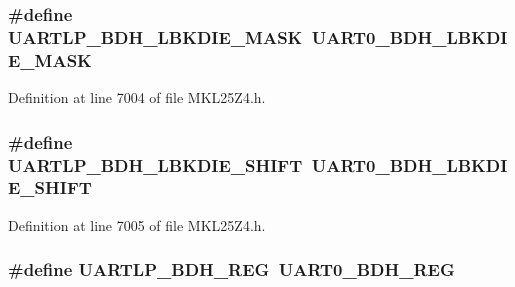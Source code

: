 \subsubsection[{\texorpdfstring{U\+A\+R\+T\+L\+P\+\_\+\+B\+D\+H\+\_\+\+L\+B\+K\+D\+I\+E\+\_\+\+M\+A\+SK}{UARTLP_BDH_LBKDIE_MASK}}]{\setlength{\rightskip}{0pt plus 5cm}\#define U\+A\+R\+T\+L\+P\+\_\+\+B\+D\+H\+\_\+\+L\+B\+K\+D\+I\+E\+\_\+\+M\+A\+SK~{\bf U\+A\+R\+T0\+\_\+\+B\+D\+H\+\_\+\+L\+B\+K\+D\+I\+E\+\_\+\+M\+A\+SK}}\hypertarget{group___backward___compatibility___symbols_ga8e7625a181ceadbf341a36dfcb59db33}{}\label{group___backward___compatibility___symbols_ga8e7625a181ceadbf341a36dfcb59db33}


Definition at line 7004 of file M\+K\+L25\+Z4.\+h.

\subsubsection[{\texorpdfstring{U\+A\+R\+T\+L\+P\+\_\+\+B\+D\+H\+\_\+\+L\+B\+K\+D\+I\+E\+\_\+\+S\+H\+I\+FT}{UARTLP_BDH_LBKDIE_SHIFT}}]{\setlength{\rightskip}{0pt plus 5cm}\#define U\+A\+R\+T\+L\+P\+\_\+\+B\+D\+H\+\_\+\+L\+B\+K\+D\+I\+E\+\_\+\+S\+H\+I\+FT~{\bf U\+A\+R\+T0\+\_\+\+B\+D\+H\+\_\+\+L\+B\+K\+D\+I\+E\+\_\+\+S\+H\+I\+FT}}\hypertarget{group___backward___compatibility___symbols_gaeda76f3a18048d7d090663cff717da2c}{}\label{group___backward___compatibility___symbols_gaeda76f3a18048d7d090663cff717da2c}


Definition at line 7005 of file M\+K\+L25\+Z4.\+h.

\subsubsection[{\texorpdfstring{U\+A\+R\+T\+L\+P\+\_\+\+B\+D\+H\+\_\+\+R\+EG}{UARTLP_BDH_REG}}]{\setlength{\rightskip}{0pt plus 5cm}\#define U\+A\+R\+T\+L\+P\+\_\+\+B\+D\+H\+\_\+\+R\+EG~{\bf U\+A\+R\+T0\+\_\+\+B\+D\+H\+\_\+\+R\+EG}}\hypertarget{group___backward___compatibility___symbols_ga30ce68ea180cb316cc6ba162f5070dd0}{}\label{group___backward___compatibility___symbols_ga30ce68ea180cb316cc6ba162f5070dd0}


